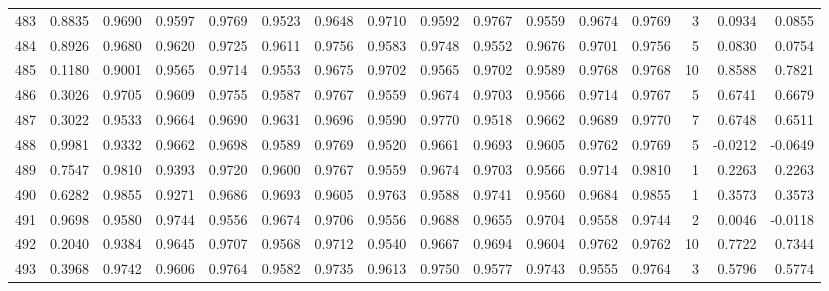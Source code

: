 \begin{tabular}{lrrrrrrrrrrrrrrr}
483 &      0.8835 &  0.9690 &  0.9597 &  0.9769 &  0.9523 &  0.9648 &  0.9710 &  0.9592 &  0.9767 &  0.9559 &   0.9674 &     0.9769 &      3 &                    0.0934 &                     0.0855 \\
484 &      0.8926 &  0.9680 &  0.9620 &  0.9725 &  0.9611 &  0.9756 &  0.9583 &  0.9748 &  0.9552 &  0.9676 &   0.9701 &     0.9756 &      5 &                    0.0830 &                     0.0754 \\
485 &      0.1180 &  0.9001 &  0.9565 &  0.9714 &  0.9553 &  0.9675 &  0.9702 &  0.9565 &  0.9702 &  0.9589 &   0.9768 &     0.9768 &     10 &                    0.8588 &                     0.7821 \\
486 &      0.3026 &  0.9705 &  0.9609 &  0.9755 &  0.9587 &  0.9767 &  0.9559 &  0.9674 &  0.9703 &  0.9566 &   0.9714 &     0.9767 &      5 &                    0.6741 &                     0.6679 \\
487 &      0.3022 &  0.9533 &  0.9664 &  0.9690 &  0.9631 &  0.9696 &  0.9590 &  0.9770 &  0.9518 &  0.9662 &   0.9689 &     0.9770 &      7 &                    0.6748 &                     0.6511 \\
488 &      0.9981 &  0.9332 &  0.9662 &  0.9698 &  0.9589 &  0.9769 &  0.9520 &  0.9661 &  0.9693 &  0.9605 &   0.9762 &     0.9769 &      5 &                   -0.0212 &                    -0.0649 \\
489 &      0.7547 &  0.9810 &  0.9393 &  0.9720 &  0.9600 &  0.9767 &  0.9559 &  0.9674 &  0.9703 &  0.9566 &   0.9714 &     0.9810 &      1 &                    0.2263 &                     0.2263 \\
490 &      0.6282 &  0.9855 &  0.9271 &  0.9686 &  0.9693 &  0.9605 &  0.9763 &  0.9588 &  0.9741 &  0.9560 &   0.9684 &     0.9855 &      1 &                    0.3573 &                     0.3573 \\
491 &      0.9698 &  0.9580 &  0.9744 &  0.9556 &  0.9674 &  0.9706 &  0.9556 &  0.9688 &  0.9655 &  0.9704 &   0.9558 &     0.9744 &      2 &                    0.0046 &                    -0.0118 \\
492 &      0.2040 &  0.9384 &  0.9645 &  0.9707 &  0.9568 &  0.9712 &  0.9540 &  0.9667 &  0.9694 &  0.9604 &   0.9762 &     0.9762 &     10 &                    0.7722 &                     0.7344 \\
493 &      0.3968 &  0.9742 &  0.9606 &  0.9764 &  0.9582 &  0.9735 &  0.9613 &  0.9750 &  0.9577 &  0.9743 &   0.9555 &     0.9764 &      3 &                    0.5796 &                     0.5774 \\

\end{tabular}
